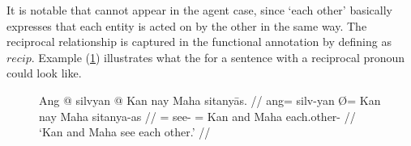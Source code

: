 It is notable that  cannot appear in the agent case, since
`each other' basically expresses that each entity is acted on by the other in
the same way. The reciprocal relationship is captured in the functional
annotation by defining \Prontype{} as $recip$. Example 
(\ref{ex:eachotheravm}) illustrates what the \Avm{} for a sentence with a
reciprocal pronoun could look like.

\begin{figure}
\ex\label{ex:eachotheravm}
\begingl
	\gla Ang @ silvyan {} @ Kan nay Maha sitanyās. //
	\glb ang= silv-yan Ø= Kan nay Maha sitanya-as //
	\glc \AgtT{}= see-\TplM{} \Top{}= Kan and Maha each.other-\Parg{} //
	\glft `Kan and Maha see each other.' //
\endgl\medskip


\xe
\end{figure}

